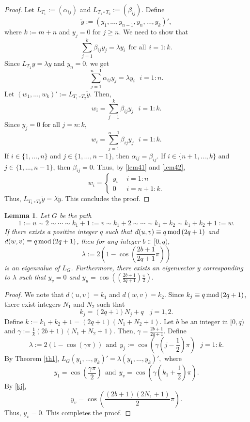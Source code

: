 \documentclass[preprint,12pt]{elsarticle}
\newcommand{\1}{\mathbf{1}}
\newcommand{\0}{\mathbf{0}}
\newtheorem{lemma}{Lemma}
\begin{document}
\begin{proof}
 Let $L_{T_1}:=(\alpha_{ij})$ and $L_{T_1 \circ T_2}:=(\beta_{ij})$.
 Define 
\[\widetilde{y}:=(y_1,\dotsc,y_{n-1},y_n,\dotsc,y_k)',\]
where $k:=m+n$ and $y_j=0$ for $j\geq n$.
We need to show that 
\[\sum_{j=1}^{k} \beta_{ij}y_j=\lambda y_i~~\mbox{for all}~~ i=1:k.\]
Since $L_{T_1}y=\lambda y$ and $y_n=0$, we get
\begin{equation}\label{lem41}
   \sum_{j=1}^{n-1}\alpha_{ij}y_j=\lambda y_i ~~~i=1:n. 
\end{equation}
Let $(w_1,\dotsc,w_k)':=L_{T_1 \circ T_2} \widetilde{y}$. 
Then, \[w_i=\sum_{j=1}^{k}\beta_{ij}y_j~~~i=1:k.\] 
Since $y_j=0$ for all $j=n:k$, 
\begin{equation}\label{lem42}
w_i=\sum_{j=1}^{n-1}\beta_{ij}y_j~~~i=1:k.
\end{equation}
If $i \in \{1,\dotsc,n\}$ and $j \in \{1,\dotsc,n-1\}$, then
$\alpha_{ij}=\beta_{ij}$. If $i \in \{n+1,\dotsc,k\}$ and
$j \in \{1,\dotsc,n-1\}$, then $\beta_{ij}=0$.
Thus, by \eqref{lem41} and \eqref{lem42},
\[w_i=
\begin{cases}
    y_i ~~&i=1:n \\
    0  ~~&i=n+1:k.
\end{cases}
\]
Thus, $L_{T_{1} \circ T_2} \widetilde{y}=\lambda \widetilde{y}$. This concludes the proof.   
\end{proof}

\begin{lemma} \label{path}
Let $G$ be the path
\[1:=u \sim 2 \sim \cdots \sim k_1+1:=v \sim k_1+2 \sim \cdots \sim k_1+k_2 \sim k_1+k_2+1:=w.\]
If there exists a positive integer $q$ such that 
$d(u,v)\equiv q\,{\rm mod}\,(2q+1)$ 
and $d(w,v)\equiv q\,{\rm mod}\,(2q+1)$, then
for any integer $b \in [0,q)$,
\[\lambda:=2\left(1-\cos \left(\frac{2b+1}{2q+1}\pi\right)\right)\]
is an eigenvalue of $L_G$. Furthermore, there exists an eigenvector
$y$ corresponding to $\lambda$ such that $y_v=0$ and $y_u=\cos\left( \left(\frac{2b+1}{2q+1}\right)\frac{\pi}{2} \right).$
\end{lemma}
\begin{proof}
We note that
$d(u,v)=k_1$ and $d(w,v)=k_2$. Since $k_j\equiv q\,{\rm{mod}}\,(2q+1)$, there exist integers $N_1$ and $N_2$ such that
\begin{equation} \label{kj}
k_j=(2q+1)N_j+q~~~~j=1,2.
\end{equation}
Define
$k:=k_1+k_2+1=(2q+1)(N_1+N_2+1)$.
Let $b$ be an integer in $[0,q)$ and
$\gamma:=\frac{1}{k} (2b+1)(N_1+N_2+1)$. Then,
 \(\gamma=\frac{2b+1}{2q+1}.\)
Define
\[\lambda:=2\left(1-\cos (\gamma \pi) \right)~~\mbox{and}~~y_j:=\cos\left(\gamma \left(j-\frac{1}{2} \right)\pi \right)~~~j=1:k.\]
By Theorem \ref{th1},
\(L_G(y_1,\dotsc,y_{k})'=\lambda (y_1,\dotsc,y_{k})',\)
where
\[y_1=\cos\left(\frac{\gamma \pi}{2}\right)~~\mbox{and}~~y_v=
        \cos \left(\gamma\left( k_1+\frac{1}{2} \right)\pi  \right).\]
By \eqref{kj}, $$y_v= \cos \left( \frac{(2b+1)(2N_1+1)}{2}\pi \right).$$
        Thus,  $y_v=0$. This completes the proof.
        \end{proof}
\end{document}
